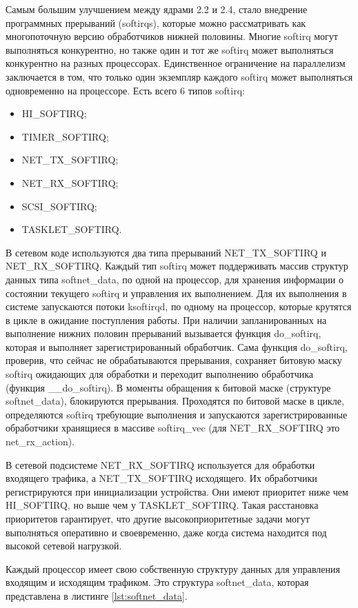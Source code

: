 Самым большим улучшением между ядрами 2.2 и 2.4, стало внедрение программных прерываний (softirqs), которые можно рассматривать как многопоточную версию обработчиков нижней половины. Многие softirq могут выполняться конкурентно, но также один и тот же softirq может выполняться конкурентно на разных процессорах. Единственное ограничение на параллелизм заключается в том, что только один экземпляр каждого softirq может выполняться одновременно на процессоре. Есть всего 6 типов softirq:
\begin{itemize}[label=---]
	\item HI\_SOFTIRQ;
	\item TIMER\_SOFTIRQ;
	\item NET\_TX\_SOFTIRQ;
	\item NET\_RX\_SOFTIRQ;
	\item SCSI\_SOFTIRQ;
	\item TASKLET\_SOFTIRQ.
\end{itemize}

В сетевом коде используются два типа прерываний NET\_TX\_SOFTIRQ и NET\_RX\_SOFTIRQ. Каждый тип softirq может поддерживать массив структур данных типа softnet\_data, по одной на процессор, для хранения информации о состоянии текущего softirq и управления их выполнением. Для их выполнения в системе запускаются потоки ksoftirqd, по одному на процессор, которые крутятся в цикле в ожидание поступления работы. При наличии запланированных на выполнение нижних половин прерываний вызывается функция do\_softirq, которая и выполняет зарегистрированный обработчик. Сама функция do\_softirq, проверив, что сейчас не обрабатываются прерывания, сохраняет битовую маску softirq ожидающих для обработки и переходит выполнению обработчика (функция \_\_do\_softirq). В моменты обращения к битовой маске (структуре softnet\_data), блокируются прерывания. Проходятся по битовой маске в цикле, определяются softirq требующие выполнения и запускаются зарегистрированные обработчики хранящиеся в массиве softirq\_vec (для NET\_RX\_SOFTIRQ это net\_rx\_action). 

В сетевой подсистеме NET\_RX\_SOFTIRQ используется для обработки входящего трафика, а NET\_TX\_SOFTIRQ исходящего. Их обработчики регистрируются при инициализации устройства. Они имеют приоритет ниже чем HI\_SOFTIRQ, но выше чем у TASKLET\_SOFTIRQ. Такая расстановка приоритетов гарантирует, что другие высокоприоритетные задачи могут выполняться оперативно и своевременно, даже когда система находится под высокой сетевой нагрузкой. 

Каждый процессор имеет свою собственную структуру данных для управления входящим и исходящим трафиком. Это структура  softnet\_data, которая представлена в листинге \ref{lst:softnet_data}.

